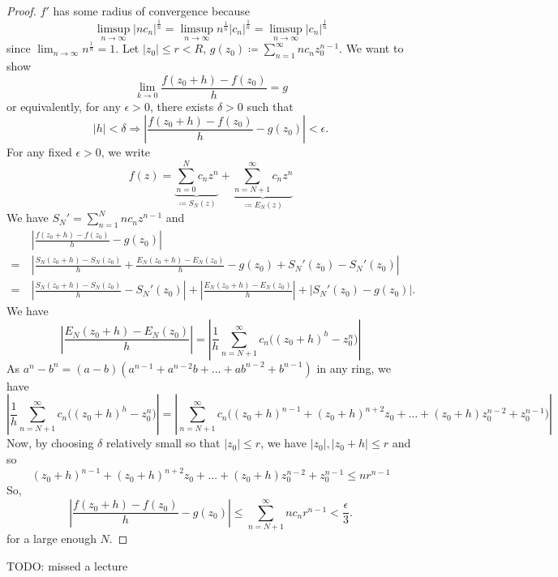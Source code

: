 \documentclass[11pt]{article}
\begin{document}
\begin{proof}
$f'$ has some radius of convergence because
\begin{equation*}
\limsup_{n\to\infty}|nc_n|^{\frac{1}{n}}
= \limsup_{n\to\infty}n^{\frac{1}{n}}|c_n|^{\frac{1}{n}}
= \limsup_{n\to\infty}|c_n|^{\frac{1}{n}}
\end{equation*}
since $\displaystyle\lim_{n\to\infty}n^{\frac{1}{n}} = 1$. Let $|z_0| \leq r <
R$, $\displaystyle g(z_0) \coloneqq \sum^\infty_{n=1} nc_nz_0^{n-1}$. We want to
show
\begin{equation*}
\lim_{k\to 0} \frac{f(z_0+h) - f(z_0)}{h} = g
\end{equation*}
or equivalently, for any $\epsilon > 0$, there exists $\delta > 0$ such that
\begin{equation*}
|h| < \delta \Rightarrow \left|\frac{f(z_0+h) - f(z_0)}{h} - g(z_0)\right| <
\epsilon.
\end{equation*}
For any fixed $\epsilon > 0$, we write
\begin{equation*}
f(z) = \underbrace{\sum^N_{n=0}c_nz^n}_{\coloneqq S_N(z)} +
\underbrace{\sum^\infty_{n=N+1}c_nz^n}_{\coloneqq E_N(z)} 
\end{equation*}
We have $S_N' = \sum^N_{n=1}nc_nz^{n-1}$ and
\begin{align*}
&\>\left|\frac{f(z_0+h) - f(z_0)}{h} - g(z_0)\right|\\
=&\> \left|\frac{S_N(z_0+h) - S_N(z_0)}{h} + \frac{E_N(z_0+h) - E_N(z_0)}{h} -
g(z_0) + S_N'(z_0) -S_N'(z_0)\right|\\
=&\> \left|\frac{S_N(z_0+h) - S_N(z_0)}{h} - S_N'(z_0) \right|
+ \left|\frac{E_N(z_0+h) - E_N(z_0)}{h}\right| + \left|S_N'(z_0) -
g(z_0)\right|.
\end{align*}
We have
\begin{equation*}
\left|\frac{E_N(z_0+h) - E_N(z_0)}{h}\right|
= \left|\frac{1}{h} \sum^\infty_{n=N+1}c_n \big((z_0+h)^h -z_0^n\big)\right|
\end{equation*}
As $a^n -b^n = (a-b)(a^{n-1} + a^{n-2}b + \dots+ab^{n-2} + b^{n-1})$ in any
ring, we have
\begin{equation*}
\left|\frac{1}{h} \sum^\infty_{n=N+1}c_n \big((z_0+h)^h -z_0^n\big)\right|
= \left|\sum^{\infty}_{n=N+1}c_n\big((z_0+h)^{n-1} + (z_0+h)^{n+2}z_0 + \dots +
(z_0+h)z_0^{n-2} + z_0^{n-1}\big)\right|
\end{equation*}
Now, by choosing $\delta$ relatively small so that $|z_0|\leq r $, we have
$|z_0|, |z_0+h| \leq r$ and so
\begin{equation*}
(z_0+h)^{n-1} + (z_0+h)^{n+2}z_0 + \dots + (z_0+h)z_0^{n-2} + z_0^{n-1} \leq nr^{n-1}
\end{equation*}
So,
\begin{equation*}
\left|\frac{f(z_0+h) - f(z_0)}{h} - g(z_0)\right| \leq
\sum^\infty_{n=N+1}nc_nr^{n-1} < \frac{\epsilon}{3}.
\end{equation*}
for a large enough $N$.

\end{proof}
TODO: missed a lecture
\end{document}
